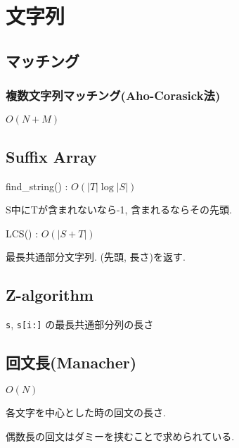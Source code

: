 
\section{文字列}
\subsection{マッチング}
\subsubsection{複数文字列マッチング(Aho-Corasick法)}
$O(N+M)$\par


\subsection{Suffix Array}
find\_string() : $O(|T|\log |S|)$\par
S中にTが含まれないなら-1, 含まれるならその先頭.\par
LCS() : $O(|S+T|)$\par
最長共通部分文字列. (先頭, 長さ)を返す.



\subsection{Z-algorithm}

\texttt{s}, \texttt{s[i:]} の最長共通部分列の長さ



\subsection{回文長(Manacher)}
$O(N)$\par
各文字を中心とした時の回文の長さ.\par
偶数長の回文はダミーを挟むことで求められている.\par

